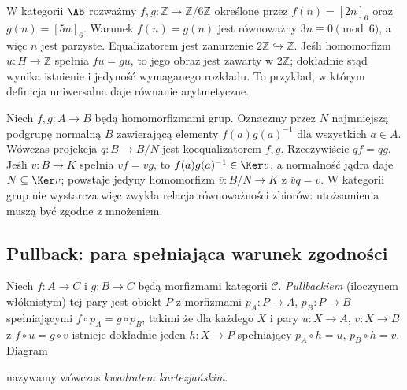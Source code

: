 \begin{przyklad}
W kategorii $\Ab$ rozważmy $f,g:\mathbb Z\to\mathbb Z/6\mathbb Z$ określone przez $f(n)=[2n]_6$ oraz $g(n)=[5n]_6$. Warunek $f(n)=g(n)$ jest równoważny $3n\equiv0\pmod 6$, a więc $n$ jest parzyste. Equalizatorem jest zanurzenie $2\mathbb Z\hookrightarrow\mathbb Z$. Jeśli homomorfizm $u:H\to\mathbb Z$ spełnia $fu=gu$, to jego obraz jest zawarty w $2\mathbb Z$; dokładnie stąd wynika istnienie i jedyność wymaganego rozkładu. To przykład, w którym definicja uniwersalna daje równanie arytmetyczne.
\end{przyklad}

\begin{przyklad}
Niech $f,g:A\to B$ będą homomorfizmami grup. Oznaczmy przez $N$ najmniejszą podgrupę normalną $B$ zawierającą elementy $f(a)g(a)^{-1}$ dla wszystkich $a\in A$. Wówczas projekcja $q:B\to B/N$ jest koequalizatorem $f,g$. Rzeczywiście $qf=qg$. Jeśli $v:B\to K$ spełnia $vf=vg$, to $f(a)g(a)^{-1}\in\Ker v$, a normalność jądra daje $N\subseteq\Ker v$; powstaje jedyny homomorfizm $\bar v:B/N\to K$ z $\bar vq=v$. W kategorii grup nie wystarcza więc zwykła relacja równoważności zbiorów: utożsamienia muszą być zgodne z mnożeniem.
\end{przyklad}


\subsection{Pullback: para spełniająca warunek zgodności}

\begin{definicja}\label{def:pullback}
Niech $f:A\to C$ i $g:B\to C$ będą morfizmami kategorii $\mathcal C$. \emph{Pullbackiem} (iloczynem włóknistym) tej pary jest obiekt $P$ z morfizmami $p_A:P\to A$, $p_B:P\to B$ spełniającymi $f\circ p_A=g\circ p_B$, takimi że dla każdego $X$ i pary $u:X\to A$, $v:X\to B$ z $f\circ u=g\circ v$ istnieje dokładnie jeden $h:X\to P$ spełniający $p_A\circ h=u$, $p_B\circ h=v$. Diagram
\begin{center}
\end{center}
nazywamy wówczas \emph{kwadratem kartezjańskim}.
\end{definicja}


